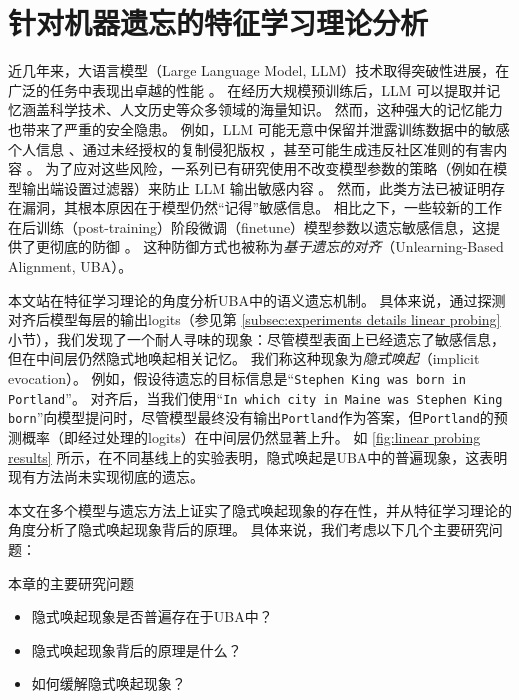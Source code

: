 \chapter{针对机器遗忘的特征学习理论分析}\label{chap5}

近几年来，大语言模型（Large Language Model, LLM）技术取得突破性进展，在广泛的任务中表现出卓越的性能 \cite{DBLP:conf/nips/BrownMRSKDNSSAA20,DBLP:journals/corr/abs-2505-09388}。
在经历大规模预训练后，LLM 可以提取并记忆涵盖科学技术、人文历史等众多领域的海量知识。
然而，这种强大的记忆能力也带来了严重的安全隐患。
例如，LLM 可能无意中保留并泄露训练数据中的敏感个人信息 \cite{DBLP:journals/corr/abs-2506-14003}、通过未经授权的复制侵犯版权 \cite{DBLP:journals/corr/abs-2505-23788}，甚至可能生成违反社区准则的有害内容 \cite{DBLP:conf/iclr/LiuXCX24}。
为了应对这些风险，一系列已有研究使用不改变模型参数的策略（例如在模型输出端设置过滤器）来防止 LLM 输出敏感内容 \cite{DBLP:conf/icml/0002MJQH0MR024,DBLP:journals/corr/abs-2505-17306}。
然而，此类方法已被证明存在漏洞\cite{DBLP:journals/corr/abs-2307-15043,DBLP:conf/satml/ChaoRDHP025,DBLP:conf/iclr/LiuXCX24}，其根本原因在于模型仍然“记得”敏感信息。
相比之下，一些较新的工作在后训练（post-training）阶段微调（finetune）模型参数以遗忘敏感信息，这提供了更彻底的防御 \cite{DBLP:journals/corr/abs-2404-05868,DBLP:conf/nips/YaoXL24,DBLP:conf/uss/SongKK0S25}。
这种防御方式也被称为\textit{基于遗忘的对齐}（Unlearning-Based Alignment, UBA）。

本文站在特征学习理论的角度分析UBA中的语义遗忘机制。
具体来说，通过探测对齐后模型每层的输出logits（参见第 \ref{subsec:experiments details linear probing} 小节），我们发现了一个耐人寻味的现象：尽管模型表面上已经遗忘了敏感信息，但在中间层仍然隐式地唤起相关记忆。
我们称这种现象为\textit{隐式唤起}（implicit evocation）。
例如，假设待遗忘的目标信息是“\texttt{Stephen King was born in Portland}”。
对齐后，当我们使用“\texttt{In which city in Maine was Stephen King born}”向模型提问时，尽管模型最终没有输出\texttt{Portland}作为答案，但\texttt{Portland}的预测概率（即经过处理的logits）在中间层仍然显著上升。
如 \cref{fig:linear probing results} 所示，在不同基线上的实验表明，隐式唤起是UBA中的普遍现象，这表明现有方法尚未实现彻底的遗忘。

本文在多个模型与遗忘方法上证实了隐式唤起现象的存在性，并从特征学习理论的角度分析了隐式唤起现象背后的原理。
具体来说，我们考虑以下几个主要研究问题：
\begin{mynote}{本章的主要研究问题}
    \begin{itemize}
        \item 隐式唤起现象是否普遍存在于UBA中？
        \item 隐式唤起现象背后的原理是什么？
        \item 如何缓解隐式唤起现象？
    \end{itemize}
\end{mynote}

